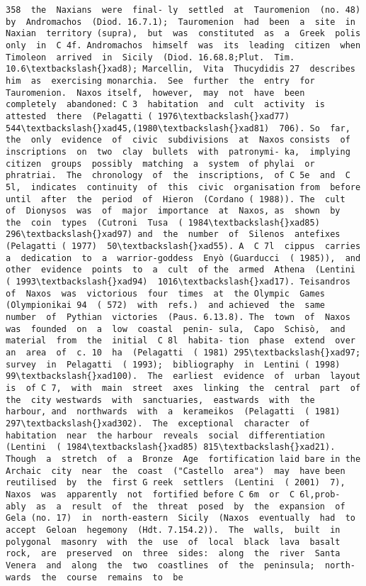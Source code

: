 \documentclass[11pt]{article}
\begin{document}
\begin{Verbatim}[commandchars=\\\{\}]
358  the  Naxians  were  final- ly  settled  at  Tauromenion  (no. 48)  by  Andromachos  (Diod. 16.7.1);  Tauromenion  had  been  a  site  in  Naxian  territory (supra),  but  was  constituted  as  a  Greek  polis  only  in  C 4f. Andromachos  himself  was  its  leading  citizen  when Timoleon  arrived  in  Sicily  (Diod. 16.68.8;Plut.  Tim. 10.6\textbackslash{}xad8); Marcellin,  Vita  Thucydidis 27  describes  him  as  exercising monarchia.  See  further  the  entry  for  Tauromenion.  Naxos itself,  however,  may  not  have  been  completely  abandoned: C 3  habitation  and  cult  activity  is  attested  there  (Pelagatti ( 1976\textbackslash{}xad77)  544\textbackslash{}xad45,(1980\textbackslash{}xad81)  706). So  far,  the  only  evidence  of  civic  subdivisions  at  Naxos consists  of  inscriptions  on  two  clay  bullets  with  patronymi- ka,  implying  citizen  groups  possibly  matching  a  system  of phylai  or  phratriai.  The  chronology  of  the  inscriptions,  of C 5e  and  C 5l,  indicates  continuity  of  this  civic  organisation from  before  until  after  the  period  of  Hieron  (Cordano ( 1988)). The  cult  of  Dionysos  was  of  major  importance  at  Naxos, as  shown  by  the  coin  types  (Cutroni  Tusa  ( 1984\textbackslash{}xad85)  296\textbackslash{}xad97) and  the  number  of  Silenos  antefixes (Pelagatti ( 1977)  50\textbackslash{}xad55). A  C 7l  cippus  carries  a  dedication  to  a  warrior-goddess  Enyò (Guarducci  ( 1985)),  and  other  evidence  points  to  a  cult  of the  armed  Athena  (Lentini  ( 1993\textbackslash{}xad94)  1016\textbackslash{}xad17). Teisandros  of  Naxos  was  victorious  four  times  at  the Olympic  Games  (Olympionikai 94  ( 572)  with  refs.)  and achieved  the  same  number  of  Pythian  victories  (Paus. 6.13.8). The  town  of  Naxos  was  founded  on  a  low  coastal  penin- sula,  Capo  Schisò,  and  material  from  the  initial  C 8l  habita- tion  phase  extend  over  an  area  of  c. 10  ha  (Pelagatti  ( 1981) 295\textbackslash{}xad97;  survey  in  Pelagatti  ( 1993);  bibliography  in  Lentini ( 1998)  99\textbackslash{}xad100).  The  earliest  evidence  of  urban  layout  is  of C 7,  with  main  street  axes  linking  the  central  part  of  the  city westwards  with  sanctuaries,  eastwards  with  the  harbour, and  northwards  with  a  kerameikos  (Pelagatti  ( 1981) 297\textbackslash{}xad302).  The  exceptional  character  of  habitation  near  the harbour  reveals  social  differentiation  (Lentini  ( 1984\textbackslash{}xad85) 815\textbackslash{}xad21). Though  a  stretch  of  a  Bronze  Age  fortification laid bare in the  Archaic  city  near  the  coast  ("Castello  area")  may  have been  reutilised  by  the  first G reek  settlers  (Lentini  ( 2001)  7), Naxos  was  apparently  not  fortified before C 6m  or  C 6l,prob- ably  as  a  result  of  the  threat  posed  by  the  expansion  of  Gela (no. 17)  in  north-eastern  Sicily  (Naxos  eventually  had  to accept  Geloan  hegemony  (Hdt. 7.154.2)).  The  walls,  built  in polygonal  masonry  with  the  use  of  local  black  lava  basalt rock,  are  preserved  on  three  sides:  along  the  river  Santa Venera  and  along  the  two  coastlines  of  the  peninsula;  north- wards  the  course  remains  to  be 
\end{Verbatim}
\end{document}
